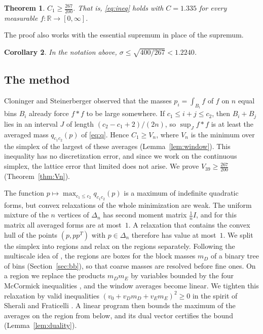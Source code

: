 \documentclass[11pt]{amsart}
\newtheorem{theorem}{Theorem}[section]
\newtheorem{corollary}[theorem]{Corollary}
\theoremstyle{definition}
\theoremstyle{remark}
\numberwithin{equation}{section}
\newcommand{\R}{\mathbb{R}}
\newcommand{\LAM}{\tfrac{267}{200}}
\newcommand{\Cone}{1.335}
\newcommand{\Nbins}{39}
\newcommand{\SidonSq}{400/267}
\newcommand{\SidonVal}{1.2240}
\begin{document}
\begin{theorem}\label{thm:main}
$C_1\ge\LAM$. That is, \eqref{eq:ineq} holds with $C=\Cone$ for every measurable $f\colon\R\to[0,\infty]$.
\end{theorem}

The proof also works with the essential supremum in place of the supremum.

\begin{corollary}\label{cor:sidon}
In the notation above, $\sigma\le\sqrt{\SidonSq}<\SidonVal$.
\end{corollary}

\subsection*{The method}
Cloninger and Steinerberger observed that the masses $p_i=\int_{B_i}f$ of $f$ on $n$ equal bins $B_i$ already force $f*f$ to be large somewhere. If $c_1\le i+j\le c_2$, then $B_i+B_j$ lies in an interval $J$ of length $(c_2-c_1+2)/(2n)$, so $\sup_J f*f$ is at least the averaged mass $q_{c_1c_2}(p)$ of \eqref{eq:q}. Hence $C_1\ge V_n$, where $V_n$ is the minimum over the simplex of the largest of these averages (Lemma~\ref{lem:window}). This inequality has no discretization error, and since we work on the continuous simplex, the lattice error that limited \cite{CS17} does not arise. We prove $V_{\Nbins}\ge\LAM$ (Theorem~\ref{thm:Vn}).

The function $p\mapsto\max_{c_1\le c_2}q_{c_1c_2}(p)$ is a maximum of indefinite quadratic forms, but convex relaxations of the whole minimization are weak. The uniform mixture of the $n$ vertices of $\Delta_n$ has second moment matrix $\frac1n I$, and for this matrix all averaged forms are at most~$1$. A relaxation that contains the convex hull of the points $(p,pp^{T})$ with $p\in\Delta_n$ therefore has value at most~$1$. We split the simplex into regions and relax on the regions separately. Following the multiscale idea of \cite{CS17}, the regions are boxes for the block masses $m_D$ of a binary tree of bins (Section~\ref{sec:bb}), so that coarse masses are resolved before fine ones. On a region we replace the products $m_Dm_E$ by variables bounded by the four McCormick inequalities \cite{McC76}, and the window averages become linear. We tighten this relaxation by valid inequalities $(v_0+v_Dm_D+v_Em_E)^2\ge0$ in the spirit of Sherali and Fraticelli \cite{SF02}. A linear program then bounds the maximum of the averages on the region from below, and its dual vector certifies the bound (Lemma~\ref{lem:duality}).
\end{document}
